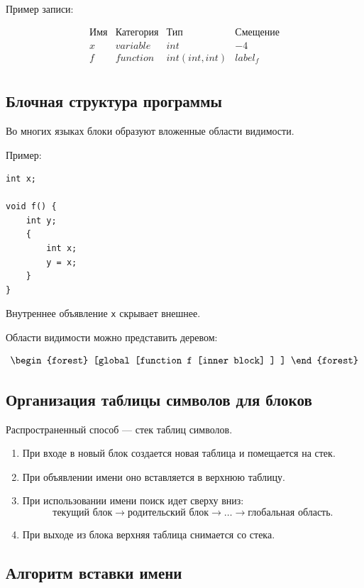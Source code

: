 \documentclass[12pt,a4paper]{article}
\begin{document}
Пример записи:

\[
\begin{array}{c|c|c|c}
\text{Имя} & \text{Категория} & \text{Тип} & \text{Смещение} \\
\hline
x & variable & int & -4 \\
f & function & int(int,int) & label_f \\
\end{array}
\]

\subsection{Блочная структура программы}

Во многих языках блоки образуют вложенные области видимости.

Пример:

\begin{lstlisting}
int x;

void f() {
    int y;
    {
        int x;
        y = x;
    }
}
\end{lstlisting}

Внутреннее объявление \texttt{x} скрывает внешнее.

Области видимости можно представить деревом:

\[
\begin{forest}
[global
  [function f
    [inner block]
  ]
]
\end{forest}
\]

\subsection{Организация таблицы символов для блоков}

Распространенный способ --- стек таблиц символов.

\begin{enumerate}
    \item При входе в новый блок создается новая таблица и помещается на стек.
    \item При объявлении имени оно вставляется в верхнюю таблицу.
    \item При использовании имени поиск идет сверху вниз:
    \[
    \text{текущий блок} \to \text{родительский блок} \to \ldots \to \text{глобальная область}.
    \]
    \item При выходе из блока верхняя таблица снимается со стека.
\end{enumerate}

\subsection{Алгоритм вставки имени}
\end{document}
